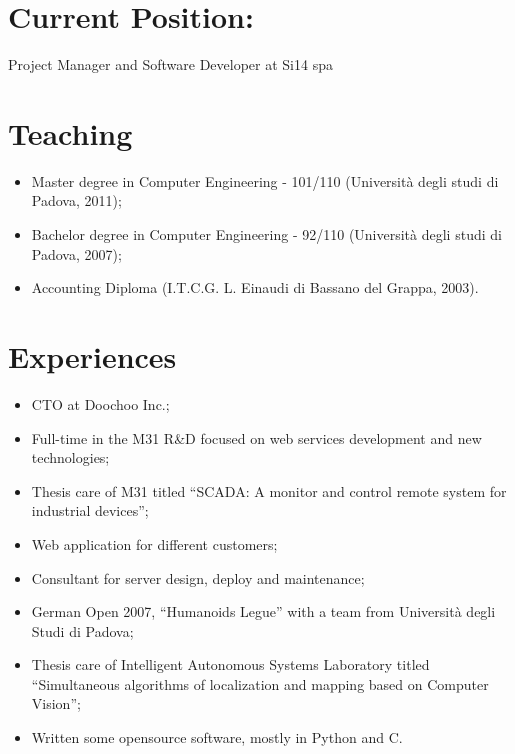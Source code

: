 \documentclass[pdftex, a4paper, 11pt]{article}
\begin{document}
\section*{Current Position:}

Project Manager and Software Developer at Si14 spa






\section*{Teaching}
\begin{itemize}
\item Master degree in Computer Engineering - 101/110 (Universit\`a degli studi di Padova, 2011);
\item Bachelor degree in Computer Engineering - 92/110 (Universit\`a degli studi di Padova, 2007);
\item Accounting Diploma (I.T.C.G. L. Einaudi di Bassano del Grappa, 2003).
\end{itemize}

\section*{Experiences}
\begin{itemize}
\item CTO at Doochoo Inc.;
\item Full-time in the M31 R\&D focused on web services development and new technologies;
\item Thesis care of M31 titled ``SCADA: A monitor and control remote system for industrial devices'';
\item Web application for different customers;
\item Consultant for server design, deploy and maintenance;
\item German Open 2007, ``Humanoids Legue'' with a team from Universit\`a
degli Studi di Padova;
\item Thesis care of Intelligent Autonomous Systems Laboratory titled ``Simultaneous
algorithms of localization and mapping based on Computer Vision'';
\item Written some opensource software, mostly in Python and C.
\end{itemize}
\end{document}
